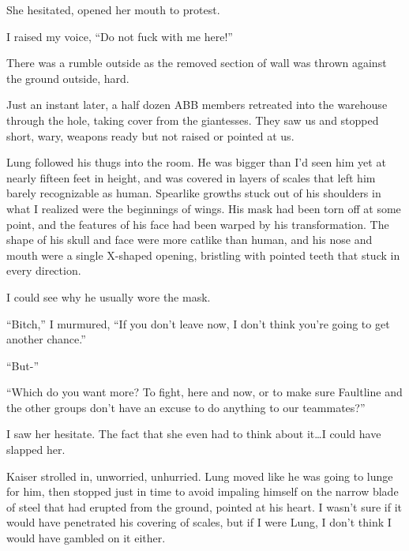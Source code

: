 She hesitated, opened her mouth to protest.



I raised my voice, ``Do not fuck with me here!''



There was a rumble outside as the removed section of wall was thrown against the ground outside, hard.



Just an instant later, a half dozen ABB members retreated into the warehouse through the hole, taking cover from the giantesses.  They saw us and stopped short, wary, weapons ready but not raised or pointed at us.



Lung followed his thugs into the room.  He was bigger than I'd seen him yet at nearly fifteen feet in height, and was covered in layers of scales that left him barely recognizable as human.  Spearlike growths stuck out of his shoulders in what I realized were the beginnings of wings.  His mask had been torn off at some point, and the features of his face had been warped by his transformation.  The shape of his skull and face were more catlike than human, and his nose and mouth were a single X-shaped opening, bristling with pointed teeth that stuck in every direction.



I could see why he usually wore the mask.



``Bitch,'' I murmured, ``If you don't leave now, I don't think you're going to get another chance.''



``But-''



``Which do you want more?  To fight, here and now, or to make sure Faultline and the other groups don't have an excuse to do anything to our teammates?''



I saw her hesitate.  The fact that she even had to think about it\ldots I could have slapped her.



Kaiser strolled in, unworried, unhurried.  Lung moved like he was going to lunge for him, then stopped just in time to avoid impaling himself on the narrow blade of steel that had erupted from the ground, pointed at his heart.  I wasn't sure if it would have penetrated his covering of scales, but if I were Lung, I don't think I would have gambled on it either.



